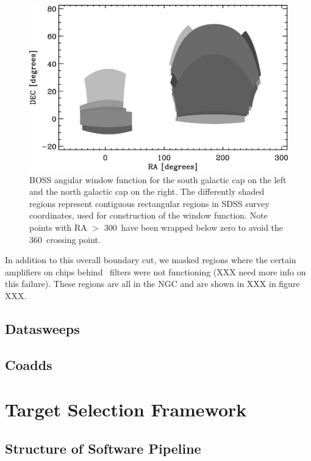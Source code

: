 \documentclass[12pt,preprint]{aastex}
\begin{document}
\begin{figure}[t] \centering
 \centering 
 \includegraphics[scale=0.6]{fig/boss-poly-coverage.eps}

 \caption{BOSS angular window function for the south galactic cap on the left
 and the north galactic cap on the right.  The differently shaded regions
 represent contiguous rectangular regions in SDSS survey coordinates, used for
 construction of the window function.  Note points with RA $>$ 300\arcdeg\ have
 been wrapped below zero to avoid the 360\arcdeg\ crossing point.}
 \label{fig:footprint}

\end{figure}



In addition to this overall boundary cut, we masked regions where the certain
amplifiers on chips behind \umag\ filters were not functioning (XXX need more
info on this failure).  These regions are all in the NGC and are shown in XXX
in figure XXX.

\subsection{Datasweeps} \label{sec:sweeps}


\subsection{Coadds}


\section{Target Selection Framework}

\subsection{Structure of Software Pipeline} \label{sec:structure}
\end{document}
